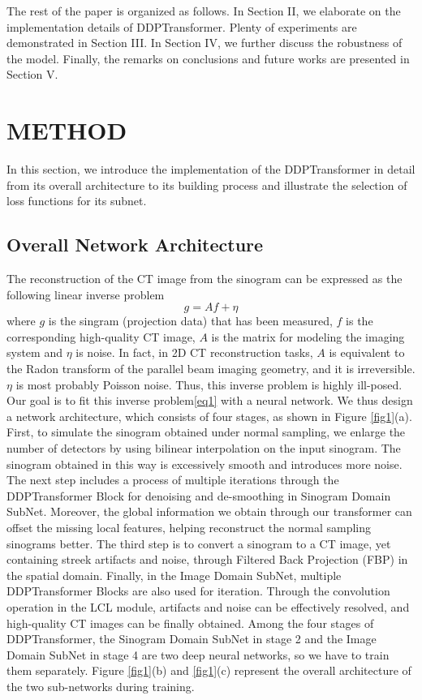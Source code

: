 \documentclass[lettersize,journal]{IEEEtran}
\begin{document}
The rest of the paper is organized as follows. In Section II, we elaborate on the implementation details of DDPTransformer. Plenty of experiments are demonstrated in Section III. In Section IV, we further discuss the robustness of the model. Finally, the remarks on conclusions and future works are presented in Section V.


\section{METHOD}
In this section, we introduce the implementation of the DDPTransformer in detail from its overall architecture to its building process and illustrate the selection of loss functions for its subnet.

\subsection{Overall Network Architecture}

The reconstruction of the CT image from the sinogram can be expressed as the following linear inverse problem
\begin{equation}
\label{eq1}
g = Af+\eta
\end{equation}
where $g$ is the singram (projection data) that has been measured, $f$ is the corresponding high-quality CT image, $A$ is the matrix for modeling the imaging system and $\eta$ is noise. In fact, in 2D CT reconstruction tasks, $A$ is equivalent to the Radon transform of the parallel beam imaging geometry, and it is irreversible. $\eta$ is most probably Poisson noise. Thus, this inverse problem is highly ill-posed. Our goal is to fit this inverse problem\eqref{eq1} with a neural network. We thus design a network architecture, which consists of four stages, as shown in Figure \ref{fig1}(a). First, to simulate the sinogram obtained under normal sampling, we enlarge the number of detectors by using bilinear interpolation on the input sinogram. The sinogram obtained in this way is excessively smooth and introduces more noise. The next step includes a process of multiple iterations through the DDPTransformer Block for denoising and de-smoothing in Sinogram Domain SubNet. Moreover, the global information we obtain through our transformer can offset the missing local features, helping reconstruct the normal sampling sinograms better. The third step is to convert a sinogram to a CT image, yet containing streek artifacts and noise, through Filtered Back Projection (FBP) in the spatial domain. Finally, in the Image Domain SubNet, multiple DDPTransformer Blocks are also used for iteration. Through the convolution operation in the LCL module, artifacts and noise can be effectively resolved, and high-quality CT images can be finally obtained. Among the four stages of DDPTransformer, the Sinogram Domain SubNet in stage 2 and the Image Domain SubNet in stage 4 are two deep neural networks, so we have to train them separately. Figure \ref{fig1}(b) and \ref{fig1}(c) represent the overall architecture of the two sub-networks during training.
\end{document}
